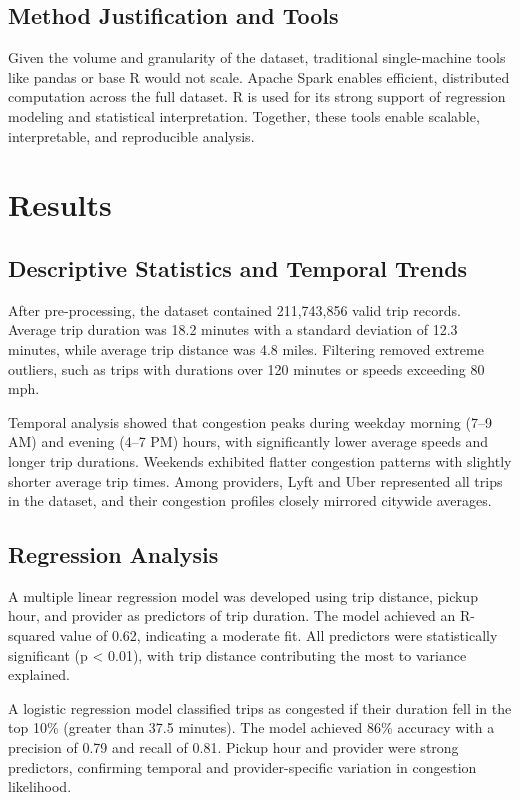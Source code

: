 \documentclass{article}
\begin{document}
\subsection{Method Justification and Tools}
Given the volume and granularity of the dataset, traditional single-machine tools like pandas or base R would not scale. Apache Spark enables efficient, distributed computation across the full dataset. R is used for its strong support of regression modeling and statistical interpretation. Together, these tools enable scalable, interpretable, and reproducible analysis.

\section{Results}
\subsection{Descriptive Statistics and Temporal Trends}

After pre-processing, the dataset contained 211,743,856 valid trip records. Average trip duration was 18.2 minutes with a standard deviation of 12.3 minutes, while average trip distance was 4.8 miles. Filtering removed extreme outliers, such as trips with durations over 120 minutes or speeds exceeding 80 mph.

Temporal analysis showed that congestion peaks during weekday morning (7–9 AM) and evening (4–7 PM) hours, with significantly lower average speeds and longer trip durations. Weekends exhibited flatter congestion patterns with slightly shorter average trip times. Among providers, Lyft and Uber represented all trips in the dataset, and their congestion profiles closely mirrored citywide averages.

\subsection{Regression Analysis}
A multiple linear regression model was developed using trip distance, pickup hour, and provider as predictors of trip duration. The model achieved an R-squared value of 0.62, indicating a moderate fit. All predictors were statistically significant (p < 0.01), with trip distance contributing the most to variance explained.

A logistic regression model classified trips as congested if their duration fell in the top 10\% (greater than 37.5 minutes). The model achieved 86\% accuracy with a precision of 0.79 and recall of 0.81. Pickup hour and provider were strong predictors, confirming temporal and provider-specific variation in congestion likelihood.
\end{document}
